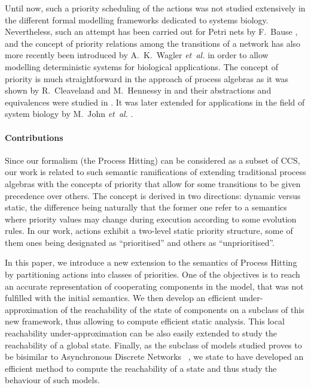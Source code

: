 Until now, such a priority scheduling of the actions was not studied extensively in the different formal modelling frameworks dedicated to systems biology.
Nevertheless, such an attempt has been carried out for Petri nets by F.~Bause \cite{Bause97},
and the concept of priority relations among the transitions of a network has also more recently been introduced by A.~K.~Wagler \textit{et~al.} \cite{waw,WaglerW12} in order to allow modelling deterministic systems for biological applications.
The concept of priority is much straightforward in the approach of process algebras as it was shown by R.~Cleaveland and M.~Hennessy in \cite{Cleaveland199058,Cleaveland99prioritiesin} and their abstractions and equivalences were studied in \cite{Cleaveland:2007:PAP:1282576.1282847}.
It was later extended for applications in the field of system biology by M.~John \textit{et~al.} \cite{jlnu2010}.

\paragraph{Contributions}
Since our formalism (the Process Hitting) can be considered as a subset of CCS, %
our work is related to such semantic ramifications of extending traditional process algebras with the concepts of priority that allow for some transitions to be given precedence over others.
The concept is derived in two directions: dynamic versus static, the difference being naturally that the former one refer to a semantics where priority values may change during execution according to some evolution rules.
In our work, actions exhibit a two-level static priority structure, some of them ones being designated as “prioritised” and others as “unprioritised”.

In this paper, we introduce a new extension to the semantics of Process Hitting by partitioning actions into classes of priorities.
One of the objectives is to reach an accurate representation of cooperating components in the model, that was not fulfilled with the initial semantics.
We then develop an efficient under-approximation of the reachability of the state of components on a subclass of this new framework, thus allowing to compute efficient static analysis.
This local reachability under-approximation can be also easily extended to study the reachability of a global state.
Finally, as the subclass of models studied proves to be bisimilar to Asynchronous Discrete Networks~\cite{Thomas73} , we state to have developed an efficient method to compute the reachability of a state and thus study the behaviour of such models.

